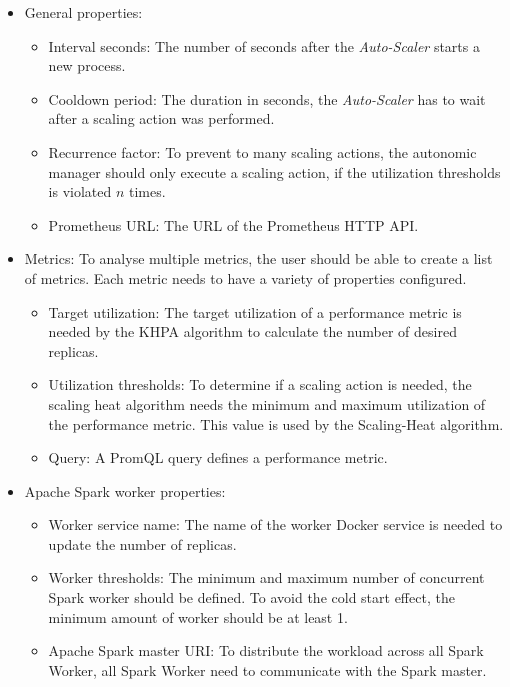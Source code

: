 \begin{itemize}
\item General properties:
\begin{itemize}
\item Interval seconds: The number of seconds after the \textit{Auto-Scaler} starts a new process.

\item Cooldown period: The duration in seconds,  the \textit{Auto-Scaler} has to wait after a scaling action was performed.

\item Recurrence factor: To prevent to many scaling actions,  the autonomic manager should only execute a scaling action,  if the utilization thresholds is violated $n$ times.

\item Prometheus URL: The URL of the Prometheus HTTP API.
\end{itemize}

\item Metrics:
To analyse multiple metrics, the user should be able to create a list of metrics. Each metric needs to have a variety of properties configured.
\begin{itemize}
\item Target utilization: The target utilization of a performance metric is needed by the KHPA algorithm to calculate the number of desired replicas.

\item Utilization thresholds: To determine if a scaling action is needed, the scaling heat algorithm needs the minimum and maximum utilization of the performance metric. This value is used by the Scaling-Heat algorithm.

\item Query: A PromQL query defines a performance metric.
\end{itemize}

\item Apache Spark worker properties:
\begin{itemize}
\item Worker service name: The name of the worker Docker service is needed to update the number of replicas.

\item Worker thresholds: The minimum and maximum number of concurrent Spark worker should be defined. To avoid the cold start effect, the minimum amount of worker should be at least 1. 

\item Apache Spark master URI: To distribute the workload across all Spark Worker, all Spark Worker need to communicate with the Spark master.
\end{itemize}
\end{itemize}


